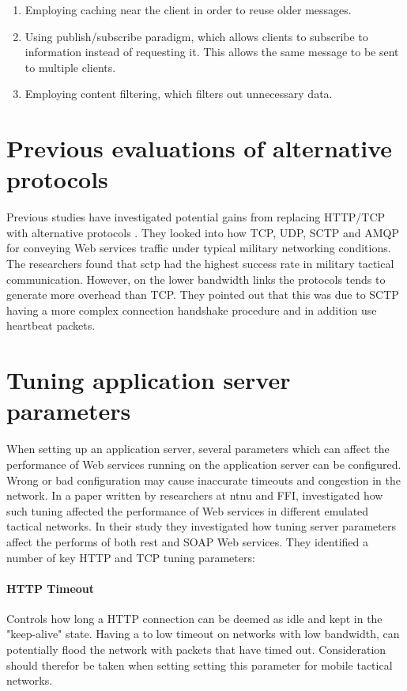 \begin{enumerate}
    \item Employing caching near the client in order to reuse older messages.
    \item Using publish/subscribe paradigm, which allows clients to subscribe to
    information instead of requesting it. This allows the same message to be sent
    to multiple clients.
    \item Employing content filtering, which filters out unnecessary data.
\end{enumerate}

\section{Previous evaluations of alternative protocols}

Previous studies have investigated potential gains from replacing HTTP/TCP with
alternative protocols \cite{evaluation-transport-protocols-web-services}. They
looked into how TCP, UDP, SCTP and AMQP for conveying Web services traffic under
typical military networking conditions. The researchers found that \gls{sctp}
had the highest success rate in military tactical communication. However, on the
lower bandwidth links the protocols tends to generate more overhead than TCP.
They pointed out that this was due to SCTP having a more complex connection
handshake procedure and in addition use heartbeat packets.

\section{Tuning application server parameters}

When setting up an application server, several parameters which can affect the
performance of Web services running on the application server can be configured.
Wrong or bad configuration may cause inaccurate timeouts and congestion in the
network. In a paper written by researchers at \gls{ntnu} and FFI, investigated
how such  tuning affected the performance of Web services in different emulated
tactical
networks\cite{johnsen-bloebaum-recommendations-web-services-tactical-domain}. In
their study they investigated how tuning server parameters affect the performs
of both \gls{rest} and SOAP Web services. They identified a number of key HTTP
and TCP tuning parameters:

\paragraph{HTTP Timeout} Controls how long a HTTP connection can be deemed as
idle and kept in the "keep-alive" state. Having a to low timeout on networks
with low bandwidth, can potentially flood the network with packets that have
timed out. Consideration should therefor be taken when setting setting this
parameter for mobile tactical networks.

